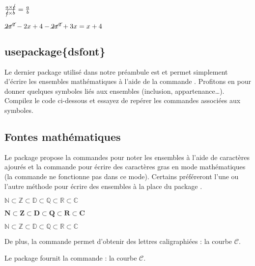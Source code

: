 {\NewFont\everymath{\textstyle}
\begin{SideBySideExample}
    $\frac{a \times \cancel{c}}{\cancel{c}\times b}
    = \frac a b$\par\medskip
    $\cancel{2x^2} - 2x + 4 - \cancel{2x^2} + 3x = x + 4$
\end{SideBySideExample}
}

\subsection{usepackage\{dsfont\}}

Le dernier package utilisé dans notre préambule est  et permet simplement d'écrire les ensembles mathématiques à l'aide de la commande . Profitons en pour donner quelques symboles liés aux ensembles (inclusion, appartenance\dots). Compilez le code ci-dessous et essayez de repérer les commandes associées aux symboles.


\subsection{Fontes mathématiques}

Le package  propose la commandes  pour noter les ensembles à l'aide de caractères ajourés et la commande  pour écrire des caractères gras en mode mathématiques (la commande  ne fonctionne pas dans ce mode). Certains préféreront l'une ou l'autre méthode pour écrire des ensembles à la place du package .\bigskip

{\NewFont
\begin{SideBySideExample}
    $\mathbb N \subset \mathbb Z \subset \mathbb D
    \subset \mathbb Q\subset \mathbb R \subset \mathbb C$

    $\mathbf N \subset \mathbf Z \subset \mathbf D
    \subset \mathbf Q\subset \mathbf R \subset \mathbf C$

    $\mathds N \subset \mathds Z \subset \mathds D
    \subset \mathds Q\subset \mathds R \subset \mathds C$
\end{SideBySideExample}
}
\bigskip

De plus, la commande  permet d'obtenir des lettres caligraphiées : la courbe $\mathcal C$.\par
Le package  fournit la commande  : la courbe $\mathscr C$.

